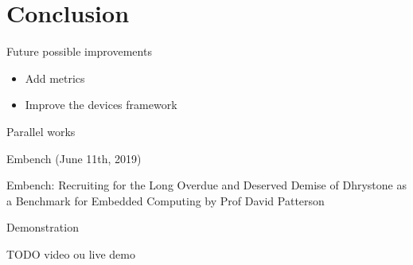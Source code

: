 \documentclass{beamer}
\begin{document}

\hypertarget{conclusion}{%
\section{Conclusion}\label{conclusion}}


\begin{frame}{Future possible improvements}
  \protect\hypertarget{future-possible-improvements}{}
  
  \begin{itemize}
  \tightlist
  \item
    Add metrics
  \item
    Improve the devices framework
  \end{itemize}
\end{frame}


\begin{frame}{Parallel works}
\protect\hypertarget{parallel-works}{}

Embench (June 11th, 2019)

\end{frame}


\begin{frame}

Embench: Recruiting for the Long Overdue and Deserved Demise of
Dhrystone as a Benchmark for Embedded Computing by Prof David Patterson

\end{frame}


\begin{frame}{Demonstration}
\protect\hypertarget{demonstration}{}

TODO video ou live demo

\end{frame}

\end{document}

